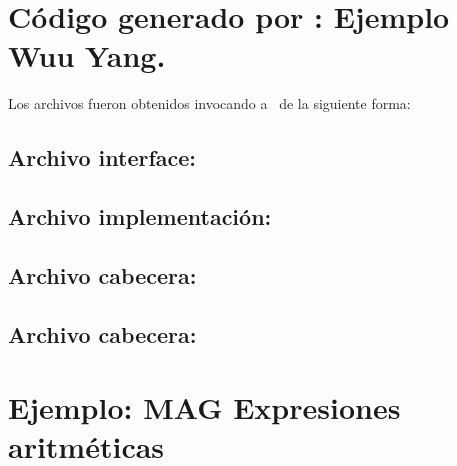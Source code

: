 \section{Código generado por \maggen: Ejemplo Wuu Yang.}
\label{append:agwuuyangcode}

Los archivos fueron obtenidos invocando a \maggen\ de la siguiente forma:

\begin{center}
\footnotesize{}
\end{center}

\subsection{Archivo interface: }
\label{append:maggenhpp}


\subsection{Archivo implementación: }
\label{append:maggencpp}


\subsection{Archivo cabecera: }
\label{append:nodehpp}


\subsection{Archivo cabecera: }
\label{append:planhpp}


\section{Ejemplo: MAG Expresiones aritméticas}
\label{append:expr_arit}

